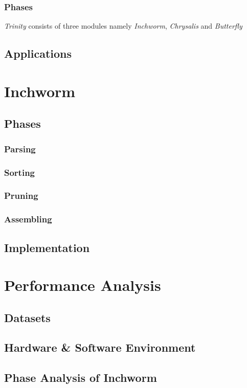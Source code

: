 \documentclass[plainarticle,zihtitle,english,final,hyperref,utf8]{zihpub}
\begin{document}
\subsubsection{Phases}
\emph{Trinity} consists of three modules namely \emph{Inchworm}, \emph{Chrysalis} and \emph{Butterfly}
\subsection{Applications}
\section{Inchworm}
\subsection{Phases}
\subsubsection{Parsing}
\subsubsection{Sorting}
\subsubsection{Pruning}
\subsubsection{Assembling}
\subsection{Implementation}
\section{Performance Analysis}
\subsection{Datasets}
\subsection{Hardware \& Software Environment}
\subsection{Phase Analysis of Inchworm}
\end{document}
